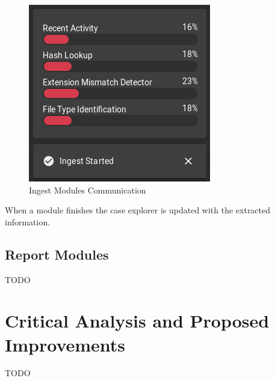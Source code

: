 \begin{figure}[h]
 \centering
 \includegraphics[width=0.5\linewidth]{imgs/modules.png}
 \caption{Ingest Modules Communication}
 \label{fig:modules}
\end{figure}

When a module finishes the case explorer is updated with the extracted information.

\subsection{Report Modules}

TODO

\section{Critical Analysis and Proposed Improvements}

TODO
